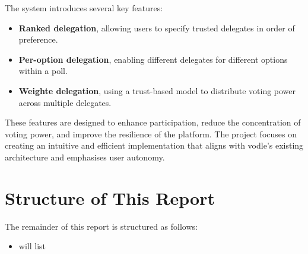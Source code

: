 The system introduces several key features:
\begin{itemize}
  \item \textbf{Ranked delegation}, allowing users to specify trusted delegates in order of preference.
  \item \textbf{Per-option delegation}, enabling different delegates for different options within a poll.
  \item \textbf{Weighte delegation}, using a trust-based model to distribute voting power across multiple delegates.
\end{itemize}

These features are designed to enhance participation, reduce the concentration of voting power, and improve the resilience of the platform. The project focuses on creating an intuitive and efficient implementation that aligns with vodle's existing architecture and emphasises user autonomy.

\section{Structure of This Report}

The remainder of this report is structured as follows:

\begin{itemize}
  \item will list
\end{itemize}
